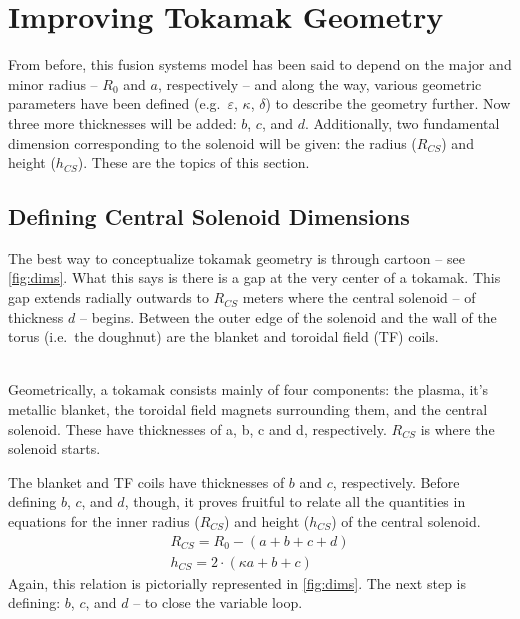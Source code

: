 \section{Improving Tokamak Geometry}

From before, this fusion systems model has been said to depend on the major and minor radius -- $R_0$ and $a$, respectively -- and along the way, various geometric parameters have been defined (e.g.\ $\varepsilon$, $\kappa$, $\delta$) to describe the geometry further. Now three more thicknesses will be added: $b$, $c$, and $d$. Additionally, two fundamental dimension corresponding to the solenoid will be given: the radius ($R_{CS}$) and height ($h_{CS}$). These are the topics of this section.

\subsection{Defining Central Solenoid Dimensions}

The best way to conceptualize tokamak geometry is through cartoon -- see \cref{fig:dims}. What this says is there is a gap at the very center of a tokamak. This gap extends radially outwards to $R_{CS}$ meters where the  central solenoid -- of thickness $d$ -- begins. Between the outer edge of the solenoid and the wall of the torus (i.e.\ the doughnut) are the blanket and toroidal field (TF) coils.

\begin{figure*}
\centering

\caption{Dimensions of Tokamak Cross-Section}
\label{fig:dims} ~ \\
\small{Geometrically, a tokamak consists mainly of four components: the plasma, it's metallic blanket, the toroidal field magnets surrounding them, and the central solenoid. These have thicknesses of a, b, c and d, respectively. $R_{CS}$ is where the solenoid starts.}
\end{figure*}

The blanket and TF coils have thicknesses of $b$ and $c$, respectively. Before defining $b$, $c$, and $d$, though, it proves fruitful to relate all the quantities in equations for the inner radius ($R_{CS}$) and height ($h_{CS}$) of the central solenoid.
 \begin{gather}
 	\label{eq:rcs1}
 	R_{CS} = R_0 - ( a + b + c + d ) \\
	\label{eq:hcs1}
 	h_{CS} = 2 \cdot \left ( \kappa a + b + c \right)
 \end{gather}
Again, this relation is pictorially represented in \cref{fig:dims}. The next step is defining: $b$, $c$, and $d$ -- to close the variable loop.

